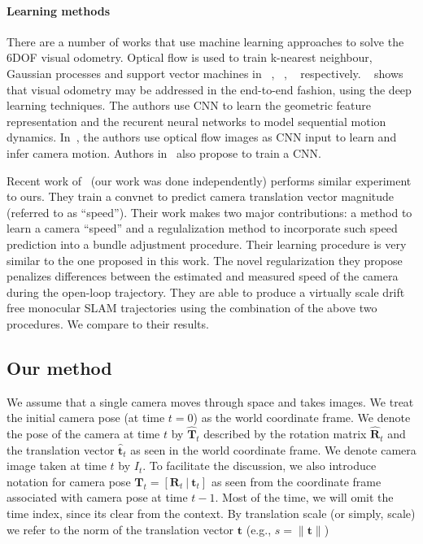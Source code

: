 \paragraph{Learning methods} There are a number of works that use
machine learning approaches to solve the 6DOF visual odometry.
Optical flow is used to train k-nearest neighbour, Gaussian processes
and support vector machines in ~\cite{roberts2008memory},
~\cite{guizilini2013semi}, ~\cite{CIARFUGLIA20141717}
respectively. ~\cite{wang2017deepvo} shows that visual odometry may be
addressed in the end-to-end fashion, using the deep learning
techniques. The authors use CNN to learn the geometric feature
representation and the recurent neural networks to model sequential
motion dynamics. In~\cite{muller2017flowdometry}, the authors use
optical flow images as CNN input to learn and infer camera
motion. Authors in~\cite{DBLP:journals/corr/MohantyADGSC16} also
propose to train a CNN.

Recent work of~\cite{frost2017using} (our work was done independently)
performs similar experiment to ours.  They train a convnet to predict
camera translation vector magnitude (referred to as ``speed'').  Their
work makes two major contributions: a method to learn a camera
``speed'' and a regulalization method to incorporate such speed
prediction into a bundle adjustment procedure.  Their learning
procedure is very similar to the one proposed in this work.  The novel
regularization they propose penalizes differences between the
estimated and measured speed of the camera during the open-loop
trajectory. They are able to produce a virtually scale drift free
monocular SLAM trajectories using the combination of the above two
procedures.  We compare to their results.

\subsection{Our method}\label{sec:our method}

We assume that a single camera moves through space and takes images.
We treat the initial camera pose (at time $t=0$) as the world
coordinate frame.  We denote the pose of the camera at time $t$ by
$\mathbf{\hat{T}}_t$ described by the rotation matrix
$\mathbf{\hat{R}}_t$ and the translation vector $\mathbf{\hat{t}}_t$
as seen in the world coordinate frame.  We denote camera image taken
at time $t$ by $I_t$.  To facilitate the discussion, we also introduce
notation for camera pose
$\mathbf{T}_t = [\mathbf{R}_t\ |\ \mathbf{t}_t] $ as seen from the
coordinate frame associated with camera pose at time $t-1$.  Most of
the time, we will omit the time index, since its clear from the
context.  By translation scale (or simply, scale) we refer to the norm
of the translation vector $\mathbf{t}$ (e.g.,
$s = \lVert \mathbf{t} \rVert$)

